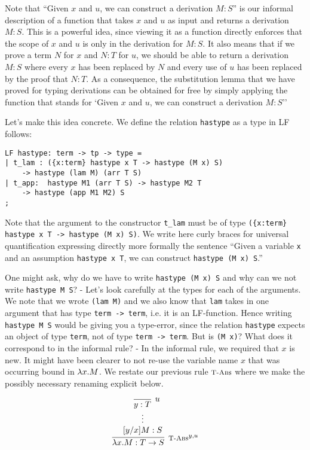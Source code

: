 Note that ``Given $x$ and $u$, we can construct a derivation $M:S$'' is our
informal description of a function that takes $x$ and $u$ as input and returns a
derivation $M:S$. This is a powerful idea, since viewing it as a function
directly enforces that the scope of $x$ and $u$ is only in the derivation for
$M:S$. It also means that if we prove a term $N$ for $x$ and $N:T$ for $u$, we
should be able to return a derivation $M:S$ where every $x$ has been replaced
by $N$ and every use of $u$ has been replaced by the proof that $N:T$. As a
consequence, the substitution lemma that we have proved for typing derivations
can be obtained for free by simply applying the function that stands for `Given
$x$ and $u$, we can construct a derivation $M:S$''


Let's make this idea concrete. We define the relation \lstinline!hastype! as
a type in LF follows:

\begin{lstlisting}
LF hastype: term -> tp -> type =
| t_lam : ({x:term} hastype x T -> hastype (M x) S)
	-> hastype (lam M) (arr T S)
| t_app:  hastype M1 (arr T S) -> hastype M2 T
	-> hastype (app M1 M2) S
;
\end{lstlisting}

Note that the argument to the constructor \lstinline!t_lam! must be of type
\lstinline!({x:term} hastype x T -> hastype (M x) S)!. We write here curly braces
for universal quantification expressing directly more formally the sentence
``Given a variable \lstinline!x! and an assumption \lstinline!hastype x T!, we can
construct \lstinline!hastype (M x) S!.''

One might ask, why do we have to write \lstinline!hastype (M x) S! and why can
we not write \lstinline!hastype M S!? - Let's look carefully at the types for
each of the arguments. We note that we wrote \lstinline!(lam M)! and we also
know that \lstinline!lam! takes in one argument that has type
\lstinline!term -> term!, i.e. it is an LF-function. Hence writing \lstinline!hastype M S! would be
giving you a type-error, since the relation \lstinline!hastype! expects an
object of type \lstinline!term!, not of type \lstinline!term -> term!.
But is \lstinline!(M x)!? What does it correspond to in the informal rule? - In the
informal rule, we required that $x$ is new. It might have been clearer to not
re-use the variable name $x$ that was occurring bound in $\lambda
x.M$. We restate our previous rule $\textsc{\footnotesize T-Abs}$ where we make the possibly necessary
renaming explicit below.

\[
\begin{array}{c}
\infer[\TFn^{y,u}]{\lam x.M : T \arrow S}
                 {\hypo{\quad\infer[u]{y:T}{}}{[y/x]M:S}}
\end{array}
\]

